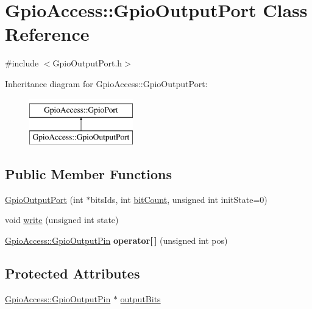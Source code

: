 \hypertarget{class_gpio_access_1_1_gpio_output_port}{\section{\-Gpio\-Access\-:\-:\-Gpio\-Output\-Port \-Class \-Reference}
\label{class_gpio_access_1_1_gpio_output_port}
}


{\ttfamily \#include $<$\-Gpio\-Output\-Port.\-h$>$}

\-Inheritance diagram for \-Gpio\-Access\-:\-:\-Gpio\-Output\-Port\-:\begin{figure}[H]
\begin{center}
\leavevmode
\includegraphics[height=2.000000cm]{class_gpio_access_1_1_gpio_output_port}
\end{center}
\end{figure}
\subsection*{\-Public \-Member \-Functions}
\begin{DoxyCompactItemize}
\item 
\hyperlink{class_gpio_access_1_1_gpio_output_port_aad40d2242724e4b4a4ce664748b8232d}{\-Gpio\-Output\-Port} (int $\ast$bits\-Ids, int \hyperlink{class_gpio_access_1_1_gpio_port_a7708b465b3c98a32e592ee985c3dcf8b}{bit\-Count}, unsigned int init\-State=0)
\item 
void \hyperlink{class_gpio_access_1_1_gpio_output_port_abc3c17790a4a89df9dd73e0818dade4a}{write} (unsigned int state)
\item 
\hypertarget{class_gpio_access_1_1_gpio_output_port_a073ac74b839c691244f4c7575ed88344}{\hyperlink{class_gpio_access_1_1_gpio_output_pin}{\-Gpio\-Access\-::\-Gpio\-Output\-Pin} {\bfseries operator\mbox{[}$\,$\mbox{]}} (unsigned int pos)}\label{class_gpio_access_1_1_gpio_output_port_a073ac74b839c691244f4c7575ed88344}

\end{DoxyCompactItemize}
\subsection*{\-Protected \-Attributes}
\begin{DoxyCompactItemize}
\item 
\hyperlink{class_gpio_access_1_1_gpio_output_pin}{\-Gpio\-Access\-::\-Gpio\-Output\-Pin} $\ast$ \hyperlink{class_gpio_access_1_1_gpio_output_port_a490b121699442f0a08beef308a867f1b}{output\-Bits}
\end{DoxyCompactItemize}


